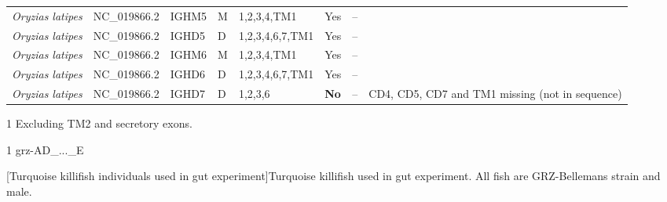 \begin{landscape}
\begin{threeparttable}
\begin{tabular}{>{\itshape}lllllllp{4cm}}
  Oryzias latipes & NC\_019866.2 & IGHM5 & M & 1,2,3,4,TM1 & Yes & -- &  \\ 
  Oryzias latipes & NC\_019866.2 & IGHD5 & D & 1,2,3,4,6,7,TM1 & Yes & -- &  \\ 
  Oryzias latipes & NC\_019866.2 & IGHM6 & M & 1,2,3,4,TM1 & Yes & -- &  \\ 
  Oryzias latipes & NC\_019866.2 & IGHD6 & D & 1,2,3,4,6,7,TM1 & Yes & -- &  \\ 
  Oryzias latipes & NC\_019866.2 & IGHD7 & D & 1,2,3,6 & \textbf{No} & -- & CD4, CD5, CD7 and TM1 missing (not in sequence) \\ 
   \bottomrule \end{tabular}
	\begin{tablenotes}
	\item[1] Excluding TM2 and secretory exons.
	\end{tablenotes}
	\end{threeparttable}
	\normalsize\vspace{1em}
	\label{tab:multispecies-ch-regions-3}
    \vspace*{\fill}
    \end{landscape}


\begin{table}
\caption[Turquoise killifish individuals used in \igseq pilot and ageing experiments]{Turquoise killifish used in \igseq pilot and ageing experiments. All fish are GRZ-AD strain and male.}
\label{tab:igseq-cohorts-fish}
\begin{threeparttable}

\begin{tablenotes}
\item[1] grz-AD\_...\_E
\end{tablenotes}
\end{threeparttable}
\end{table}

\begin{landscape}
\centering
\vspace*{\fill}
\scriptsize

\normalsize\vspace{1em}
[Turquoise killifish individuals used in \igseq gut experiment]{Turquoise killifish used in \igseq gut experiment. All fish are GRZ-Bellemans strain and male.}
\label{tab:gut-cohorts-fish}
\vspace*{\fill}
\end{landscape}
